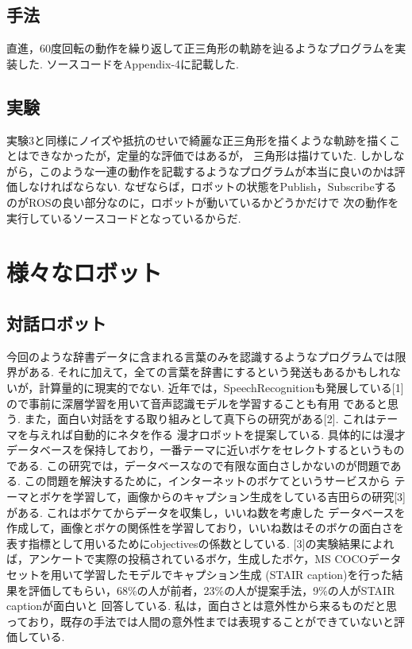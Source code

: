 \documentclass[10pt,a4j]{jsarticle}
\begin{document}
  \subsection{手法}
  直進，60度回転の動作を繰り返して正三角形の軌跡を辿るようなプログラムを実装した.
  ソースコードをAppendix-4に記載した.

  \subsection{実験}
  実験3と同様にノイズや抵抗のせいで綺麗な正三角形を描くような軌跡を描くことはできなかったが，定量的な評価ではあるが，
  三角形は描けていた. しかしながら，このような一連の動作を記載するようなプログラムが本当に良いのかは評価しなければならない.
  なぜならば，ロボットの状態をPublish，SubscribeするのがROSの良い部分なのに，ロボットが動いているかどうかだけで
  次の動作を実行しているソースコードとなっているからだ.

\section{様々なロボット}
  \subsection{対話ロボット}
  今回のような辞書データに含まれる言葉のみを認識するようなプログラムでは限界がある.
  それに加えて，全ての言葉を辞書にするという発送もあるかもしれないが，計算量的に現実的でない.
  近年では，SpeechRecognitionも発展している[1]ので事前に深層学習を用いて音声認識モデルを学習することも有用
  であると思う. また，面白い対話をする取り組みとして真下らの研究がある[2]. これはテーマを与えれば自動的にネタを作る
  漫才ロボットを提案している. 具体的には漫才データベースを保持しており，一番テーマに近いボケをセレクトするというものである.
  この研究では，データベースなので有限な面白さしかないのが問題である. この問題を解決するために，インターネットのボケてというサービスから
  テーマとボケを学習して，画像からのキャプション生成をしている吉田らの研究[3]がある. これはボケてからデータを収集し，いいね数を考慮した
  データベースを作成して，画像とボケの関係性を学習しており，いいね数はそのボケの面白さを表す指標として用いるためにobjectivesの係数としている.
  [3]の実験結果によれば，アンケートで実際の投稿されているボケ，生成したボケ，MS COCOデータセットを用いて学習したモデルでキャプション生成
  (STAIR caption)を行った結果を評価してもらい，68\%の人が前者，23\%の人が提案手法，9\%の人がSTAIR captionが面白いと
  回答している. 私は，面白さとは意外性から来るものだと思っており，既存の手法では人間の意外性までは表現することができていないと評価している.
\end{document}
